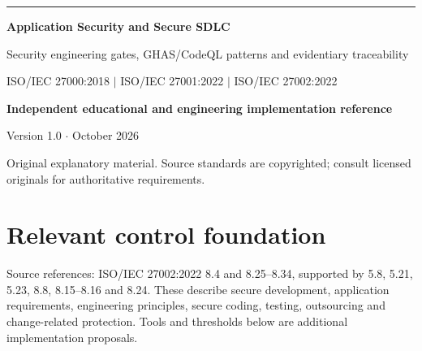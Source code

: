 \documentclass[11pt,letterpaper]{article}
\begin{document}
\begin{titlepage}
\vspace*{1.2in}
{\color{teal}\rule{\textwidth}{4pt}}\par\vspace{20pt}
{\Huge\bfseries\color{navy} Application Security and Secure SDLC}\par\vspace{18pt}
{\Large\color{graytext} Security engineering gates, GHAS/CodeQL patterns and evidentiary traceability}\par\vspace{1.3in}
{\large ISO/IEC 27000:2018 $\vert$ ISO/IEC 27001:2022 $\vert$ ISO/IEC 27002:2022}\par
\vfill
\textbf{Independent educational and engineering implementation reference}\par
Version 1.0 $\cdot$ October 2026\par
{\small Original explanatory material. Source standards are copyrighted; consult licensed originals for authoritative requirements.}\par
\end{titlepage}
\tableofcontents\clearpage{}
\section{Relevant control foundation}
Source references: ISO/IEC 27002:2022 8.4 and 8.25--8.34, supported by 5.8, 5.21, 5.23, 8.8, 8.15--8.16 and 8.24. These describe secure development, application requirements, engineering principles, secure coding, testing, outsourcing and change-related protection. Tools and thresholds below are additional implementation proposals.
\end{document}
